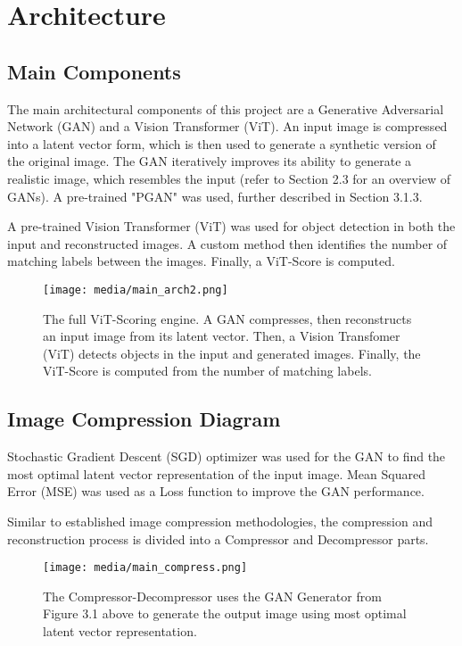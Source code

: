 \section{Architecture}

\subsection{Main Components}

The main architectural components of this project are a Generative Adversarial Network (GAN) and a Vision Transformer (ViT).
An input image is compressed into a latent vector form, which is then used to generate a synthetic version of the original image.
The GAN iteratively improves its ability to generate a realistic image, which resembles the input (refer to Section 2.3 for an overview of GANs).
A pre-trained "PGAN" was used, further described in Section 3.1.3.

A pre-trained Vision Transformer (ViT) was used for object detection in both the input and reconstructed images. 
A custom method then identifies the number of matching labels between the images. Finally, a ViT-Score is computed. 

\begin{figure}[H]
	\begin{center}
	\texttt{[image: media/main\_arch2.png]}
	\end{center}
	\caption[Model Architecture]{The full ViT-Scoring engine. A GAN compresses, then reconstructs
    an input image from its latent vector. Then, a Vision Transfomer (ViT) detects objects in the input and generated images.
    Finally, the ViT-Score is computed from the number of matching labels.}
	\end{figure}

\subsection{Image Compression Diagram}


Stochastic Gradient Descent (SGD) optimizer was used for the GAN to find the most optimal latent vector representation of the input image.
Mean Squared Error (MSE) was used as a Loss function to improve the GAN performance.

Similar to established image compression methodologies, the compression and reconstruction process 
is divided into a Compressor and Decompressor parts.

\begin{figure}[H]
	\begin{center}
	\texttt{[image: media/main\_compress.png]}
	\end{center}
	\caption[Compression Architecture]{The Compressor-Decompressor uses the GAN Generator from Figure 3.1 above 
    to generate the output image using most optimal latent vector representation.}
	\end{figure}

